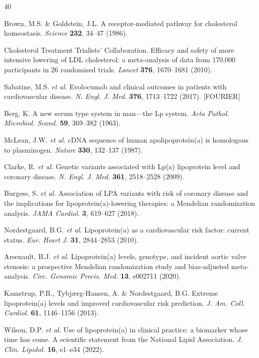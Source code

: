 \documentclass[11pt,a4paper]{article}
\begin{document}
\begin{thebibliography}{40}

 Brown, M.S. \& Goldstein, J.L. A receptor-mediated pathway for cholesterol homeostasis. \textit{Science} \textbf{232}, 34--47 (1986).

 Cholesterol Treatment Trialists' Collaboration. Efficacy and safety of more intensive lowering of LDL cholesterol: a meta-analysis of data from 170,000 participants in 26 randomised trials. \textit{Lancet} \textbf{376}, 1670--1681 (2010).

 Sabatine, M.S. \textit{et al.} Evolocumab and clinical outcomes in patients with cardiovascular disease. \textit{N. Engl. J. Med.} \textbf{376}, 1713--1722 (2017). [FOURIER]

 Berg, K. A new serum type system in man---the Lp system. \textit{Acta Pathol. Microbiol. Scand.} \textbf{59}, 369--382 (1963).

 McLean, J.W. \textit{et al.} cDNA sequence of human apolipoprotein(a) is homologous to plasminogen. \textit{Nature} \textbf{330}, 132--137 (1987).

 Clarke, R. \textit{et al.} Genetic variants associated with Lp(a) lipoprotein level and coronary disease. \textit{N. Engl. J. Med.} \textbf{361}, 2518--2528 (2009).

 Burgess, S. \textit{et al.} Association of LPA variants with risk of coronary disease and the implications for lipoprotein(a)-lowering therapies: a Mendelian randomization analysis. \textit{JAMA Cardiol.} \textbf{3}, 619--627 (2018).

 Nordestgaard, B.G. \textit{et al.} Lipoprotein(a) as a cardiovascular risk factor: current status. \textit{Eur. Heart J.} \textbf{31}, 2844--2853 (2010).

 Arsenault, B.J. \textit{et al.} Lipoprotein(a) levels, genotype, and incident aortic valve stenosis: a prospective Mendelian randomization study and bias-adjusted meta-analysis. \textit{Circ. Genomic Precis. Med.} \textbf{13}, e002711 (2020).

 Kamstrup, P.R., Tybj{\ae}rg-Hansen, A. \& Nordestgaard, B.G. Extreme lipoprotein(a) levels and improved cardiovascular risk prediction. \textit{J. Am. Coll. Cardiol.} \textbf{61}, 1146--1156 (2013).

 Wilson, D.P. \textit{et al.} Use of lipoprotein(a) in clinical practice: a biomarker whose time has come. A scientific statement from the National Lipid Association. \textit{J. Clin. Lipidol.} \textbf{16}, e1--e34 (2022).


\end{thebibliography}
\end{document}
